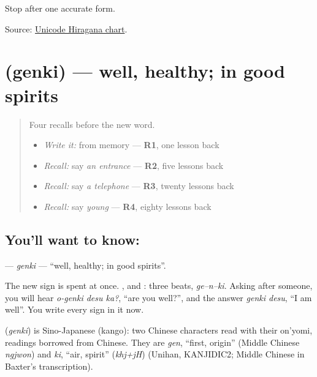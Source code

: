 \begin{tcolorbox}[breakable,colback=teal!4,colframe=teal!35!black,title={Before you move on}]
Stop after one accurate form.

Source: \href{https://www.unicode.org/charts/PDF/U3040.pdf}{Unicode Hiragana chart}.
\end{tcolorbox}
\section[\texorpdfstring{\ja{げんき} (genki)}{げんき (genki)}]{ (genki) — well, healthy; in good spirits}

\label{lesson:JA-C135-genki}



\begin{quote}
Four recalls before the new word.

\begin{itemize}
\raggedright
  \item \emph{Write it:} \textbf{} from memory — \textbf{R1}, one lesson back
  \item \emph{Recall:} say \emph{an entrance} — \textbf{R2}, five lessons back
  \item \emph{Recall:} say \emph{a telephone} — \textbf{R3}, twenty lessons back
  \item \emph{Recall:} say \emph{young} — \textbf{R4}, eighty lessons back
\end{itemize}
\end{quote}

\subsection*{You'll want to know: }
\textbf{} — \emph{genki} — \textquotedblleft{}well, healthy; in good spirits\textquotedblright{}.

The new sign is spent at once. \textbf{}, \textbf{} and \textbf{}: three beats, \emph{ge–n–ki}. Asking after someone, you will hear \emph{o-genki desu ka?}, \textquotedblleft{}are you well?\textquotedblright{}, and the answer \emph{genki desu}, \textquotedblleft{}I am well\textquotedblright{}. You write every sign in it now.

\begin{cousinweb}
\textbf{} (\emph{genki}) is Sino-Japanese (kango): two Chinese characters read with their on'yomi, readings borrowed from Chinese. They are \emph{gen}, \textquotedblleft{}first, origin\textquotedblright{} (Middle Chinese \emph{ngjwon}) and \emph{ki}, \textquotedblleft{}air, spirit\textquotedblright{} (\emph{khj+jH}) (Unihan, KANJIDIC2; Middle Chinese in Baxter's transcription).
\end{cousinweb}

